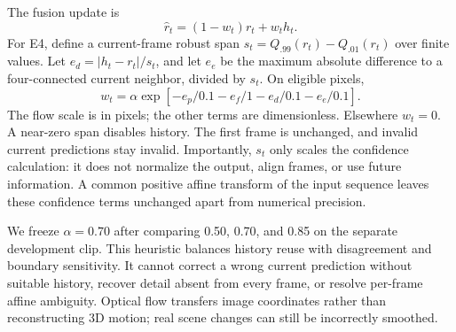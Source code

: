 The fusion update is
\begin{equation}
\widehat r_t=(1-w_t)r_t+w_th_t.
\label{eq:fusion}
\end{equation}
For E4, define a current-frame robust span $s_t=Q_{.99}(r_t)-Q_{.01}(r_t)$ over finite values. Let $e_d=|h_t-r_t|/s_t$, and let $e_e$ be the maximum absolute difference to a four-connected current neighbor, divided by $s_t$. On eligible pixels,
\begin{equation}
w_t=\alpha\exp\left[-e_p/0.1-e_f/1-e_d/0.1-e_e/0.1\right].
\label{eq:weight}
\end{equation}
The flow scale is in pixels; the other terms are dimensionless. Elsewhere $w_t=0$. A near-zero span disables history. The first frame is unchanged, and invalid current predictions stay invalid. Importantly, $s_t$ only scales the confidence calculation: it does not normalize the output, align frames, or use future information. A common positive affine transform of the input sequence leaves these confidence terms unchanged apart from numerical precision.

We freeze $\alpha=0.70$ after comparing 0.50, 0.70, and 0.85 on the separate development clip. This heuristic balances history reuse with disagreement and boundary sensitivity. It cannot correct a wrong current prediction without suitable history, recover detail absent from every frame, or resolve per-frame affine ambiguity. Optical flow transfers image coordinates rather than reconstructing 3D motion; real scene changes can still be incorrectly smoothed.
